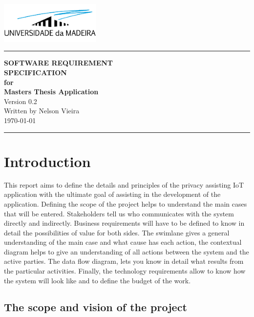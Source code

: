 \documentclass{scrreprt}
\date{}
\begin{document}
\begin{flushright}
    \includegraphics[width=5cm]{../../thesis/assets/images/uma_logo.png}
    \rule{16cm}{5pt}\vskip1cm
    \Huge{\textbf{\uppercase{Software Requirement}} \\ \textbf{\uppercase{Specification}}} \\
    \vspace{1cm}
    \textbf{for} \\
    \vspace{1cm}
    \textbf{Masters Thesis Application} \\
    \vspace{2cm}
    \LARGE{Version 0.2 \\}
    \vspace{2cm}
    Written by Nelson Vieira \\
    \vspace{2cm}
    \today
    \vfill
    \rule{16cm}{5pt}
\end{flushright}

\tableofcontents

\chapter{Introduction}

This report aims to define the details and principles of the privacy assisting
IoT application with the ultimate goal of assisting in the development
of the application. Defining the scope of the project helps to understand
the main cases that will be entered. Stakeholders tell us who communicates
with the system directly and indirectly. Business requirements will have
to be defined to know in detail the possibilities of value for both sides.
The swimlane gives a general understanding of the main case and what cause
has each action, the contextual diagram helps to give an understanding
of all actions between the system and the active parties. The data flow
diagram, lets you know in detail what results from the particular activities.
Finally, the technology requirements allow to know how the system will
look like and to define the budget of the work.

\section{The scope and vision of the project}
\end{document}
